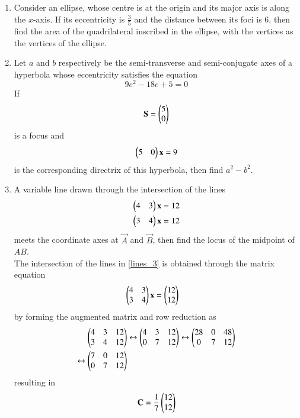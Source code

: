 \documentclass[journal,12pt,twocolumn]{IEEEtran}
\begin{document}
\begin{enumerate}[label=\arabic*]
\item  Consider an ellipse, whose centre is at the origin and its major axis is along the $x$-axis.  If its 
eccentricity is $\frac{3}{5}$ and the distance between its foci is 6, then find the area of the quadrilateral 
inscribed in the ellipse,  with the vertices as the vertices of the ellipse.
\item Let $a$ and $b$ respectively be the semi-transverse and semi-conjugate axes of a hyperbola whose 
eccentricity satisfies the equation
\begin{equation}
9e^2-18e+5 = 0
\end{equation}
If 
\begin{equation} 
\mathbf{S}=\begin{pmatrix}5\\ 0\end{pmatrix}
\end{equation}
is a focus and 
\begin{equation} 
\begin{pmatrix}5 & 0\end{pmatrix}\mathbf{x} = 9
\end{equation} 
%
is the corresponding directrix of this hyperbola, then find $a^2-b^2$.
\item A variable line drawn through the 
intersection of the lines 
\begin{align} 
\label{lines_3}
\begin{pmatrix}4 & 3\end{pmatrix}\mathbf{x} &=12 
\\ 
\begin{pmatrix}3 & 4\end{pmatrix}\mathbf{x} &=12 
\end{align} 
meets the coordinate axes at $\vec{A}$ and $\vec{B}$, then find the locus of the midpoint of $AB$. 
\\
\solution The intersection of the lines in \eqref{lines_3} is obtained through the matrix equation 
\begin{align}
\begin{pmatrix}4 & 3 \\ 3 & 4\end{pmatrix}\mathbf{x}  &=\begin{pmatrix}12\\12\end{pmatrix}
\end{align}
by forming the augmented matrix and row reduction as  
\begin{align}
\begin{pmatrix}4 & 3 &12 \\ 3 & 4 &12\end{pmatrix} &\leftrightarrow \begin{pmatrix}4 & 3 &12 \\ 0 & 7 &12\end{pmatrix} \leftrightarrow \begin{pmatrix}28 & 0 & 48 \\ 0 & 7 &12\end{pmatrix}
\nonumber \\
\leftrightarrow \begin{pmatrix}7 & 0 & 12 \\ 0 & 7 &12\end{pmatrix}&
\end{align}
resulting in 
\begin{align}
\mathbf{C}=\frac{1}{7}\begin{pmatrix}12\\12\end{pmatrix}
\end{align}

\end{enumerate}
\end{document}
